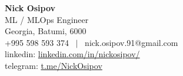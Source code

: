 \documentclass[letterpaper,12pt]{fed-res} %
\begin{document}
\begin{center}
    \textbf{\Huge Nick Osipov} \\ \vspace{1pt}
    ML / MLOps Engineer \\ \vspace{1pt}
    Georgia, Batumi, 6000 \\ \vspace{1pt}
    +995 598 593 374 \ $|$ \ nick.osipov.91@gmail.com \\ \vspace{1pt}
    linkedin: \href{https://www.linkedin.com/in/nickosipov/}{linkedin.com/in/nickosipov/} \\ \vspace{1pt}
    telegram: \href{https://t.me/NickOsipov}{t.me/NickOsipov} \\ \vspace{1pt}
\end{center}







\end{document}
